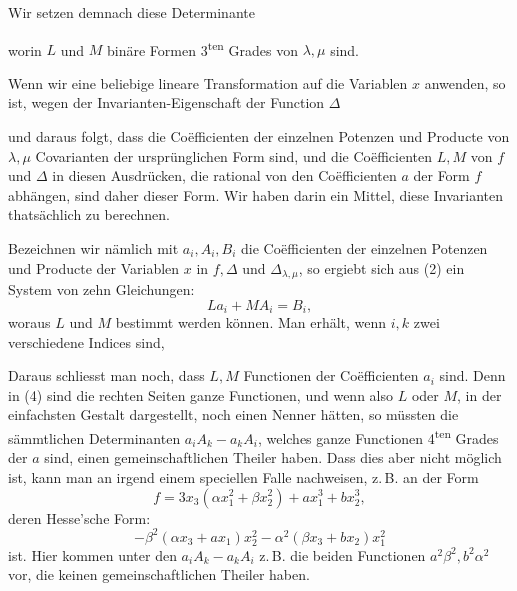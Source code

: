 Wir setzen demnach diese Determinante

worin $L$ und $M$ binäre Formen 3\textsuperscript{ten} Grades von
$\lambda, \mu$ sind.

Wenn wir eine beliebige lineare Transformation auf die Variablen $x$
anwenden, so ist, wegen der Invarianten-Eigenschaft der Function $\Delta$

und daraus folgt, dass die Coëfficienten der einzelnen Potenzen und
Producte von $\lambda, \mu$ Covarianten der ursprünglichen Form sind, und
die Coëfficienten $L, M$ von $f$ und $\Delta$ in diesen Ausdrücken, die
rational von den Coëfficienten $a$ der Form $f$ abhängen, sind daher
 dieser Form. Wir haben darin ein Mittel, diese Invarianten
thatsächlich zu berechnen.

Bezeichnen wir nämlich mit $a_i, A_i, B_i$ die Coëfficienten der
einzelnen Potenzen und Producte der Variablen $x$ in $f, \Delta$ und
$\Delta_{\lambda,\mu}$, so ergiebt sich aus (2) ein System von zehn
Gleichungen:
\[
L a_i + M A_i = B_i,
\]
woraus $L$ und $M$ bestimmt werden können. Man erhält, wenn $i, k$ zwei
verschiedene Indices sind,

Daraus schliesst man noch, dass $L, M$  Functionen der
Coëfficienten $a_i$ sind. Denn in (4) sind die rechten Seiten ganze
Functionen, und wenn also $L$ oder $M$, in der einfachsten Gestalt
dargestellt, noch einen Nenner hätten, so müssten die sämmtlichen
Determinanten $a_iA_k - a_kA_i$, welches ganze Functionen
4\textsuperscript{ten} Grades der $a$ sind, einen gemeinschaftlichen
Theiler haben. Dass dies aber nicht möglich ist, kann man an irgend
einem speciellen Falle nachweisen, z.\,B. an der Form
\[
f = 3x_3(\alpha x_1^2 + \beta x_2^2) + a x_1^3 + b x_2^3,
\]
deren Hesse'sche Form:
\[
-\beta^2(\alpha x_3 + a x_1)x_2^2 - \alpha^2(\beta x_3 + b x_2)x_1^2
\]
ist. Hier kommen unter den $a_iA_k - a_kA_i$ z.\,B. die beiden
Functionen $a^2\beta^2, b^2\alpha^2$ vor, die keinen gemeinschaftlichen
Theiler haben.
